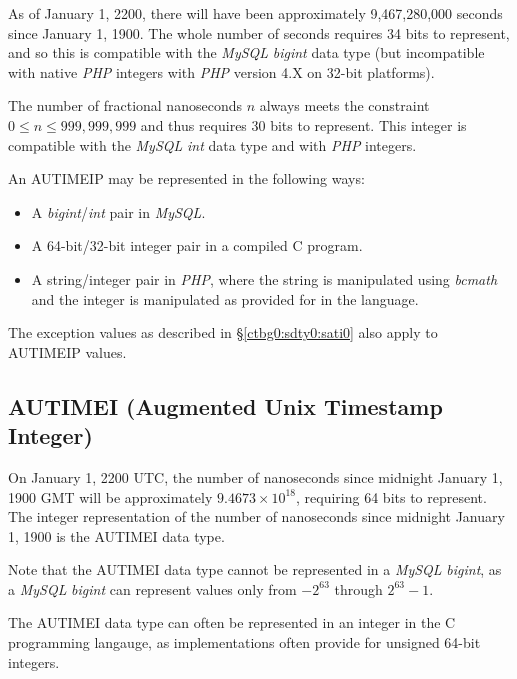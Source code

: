 As of January 1, 2200, there will have been approximately
9,467,280,000 seconds since January 1, 1900.  The whole number
of seconds requires 34 bits to represent, and so this is compatible
with the \emph{MySQL} \emph{bigint} data type (but incompatible with
native \emph{PHP} integers with \emph{PHP} version 4.X on 32-bit
platforms).

The number of fractional nanoseconds $n$ always meets the
constraint $0 \leq n \leq 999,999,999$ and thus requires
30 bits to represent.  This integer is compatible with
the \emph{MySQL} \emph{int} data type and with \emph{PHP}
integers.

An AUTIMEIP may be represented in the following ways:

\begin{itemize}
\item A \emph{bigint}/\emph{int} pair in \emph{MySQL}.
\item A 64-bit/32-bit integer pair in a compiled C program.
\item A string/integer pair in \emph{PHP}, where the string
      is manipulated using \emph{bcmath} and the integer
      is manipulated as provided for in the language.
\end{itemize}

The exception values as described in \S{}\ref{ctbg0:sdty0:sati0}
also apply to AUTIMEIP values.


\subsection{AUTIMEI (Augmented Unix Timestamp Integer)}
\label{ctbg0:sdty0:sati3}

On January 1, 2200 UTC, the number of nanoseconds since 
midnight January 1, 1900 GMT will be approximately 
$9.4673 \times 10^{18}$, requiring 
64 bits to represent.  The integer representation of
the number of nanoseconds since midnight January 1, 1900
is the AUTIMEI data type.

Note that the AUTIMEI data type cannot be represented in a 
\emph{MySQL} \emph{bigint}, as a \emph{MySQL} \emph{bigint}
can represent values only from $-2^{63}$ through $2^{63}-1$.

The AUTIMEI data type can often be represented in an integer
in the C programming langauge, as implementations often provide
for unsigned 64-bit integers.

